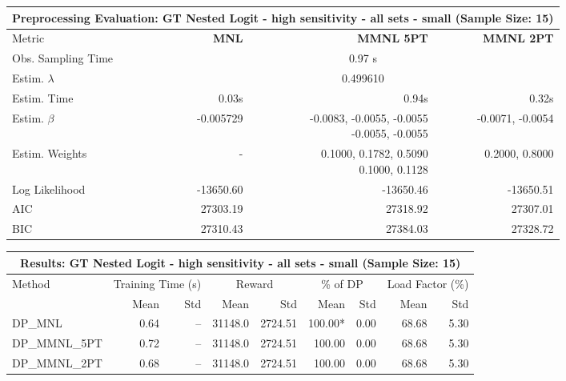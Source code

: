
\begin{samepage}
\begin{center}
  \small
  \begin{tabular}{l|r|r|r}
    \toprule
    \multicolumn{4}{c}{\textbf{Preprocessing Evaluation: GT Nested Logit - high sensitivity - all sets - small (Sample Size: 15)}} \\
    \midrule
    Metric & \textbf{MNL} & \textbf{MMNL 5PT} & \textbf{MMNL 2PT} \\
    \midrule
    Obs. Sampling Time & \multicolumn{3}{c}{0.97 s} \\
    Estim. $\lambda$ & \multicolumn{3}{c}{0.499610} \\
    Estim. Time & 0.03s & 0.94s & 0.32s \\
    Estim. $\beta$ & -0.005729 & \makecell[tr]{-0.0083, -0.0055, -0.0055 \\ -0.0055, -0.0055} & -0.0071, -0.0054 \\
    Estim. Weights & - & \makecell[tr]{0.1000, 0.1782, 0.5090 \\ 0.1000, 0.1128} & 0.2000, 0.8000 \\
    Log Likelihood & -13650.60 & -13650.46 & -13650.51 \\
    AIC & 27303.19 & 27318.92 & 27307.01 \\
    BIC & 27310.43 & 27384.03 & 27328.72 \\
    \bottomrule
  \end{tabular}
\end{center}
\begin{center}
  \small
  \begin{tabular}{l|rr|rr|rr|rr}
    \toprule
    \multicolumn{9}{c}{\textbf{Results: GT Nested Logit - high sensitivity - all sets - small (Sample Size: 15)}} \\
    \midrule
    Method & \multicolumn{2}{c|}{Training Time (s)} & \multicolumn{2}{c|}{Reward} & \multicolumn{2}{c|}{\% of DP} & \multicolumn{2}{c}{Load Factor (\%)} \\
    & Mean & Std & Mean & Std & Mean & Std & Mean & Std \\
    \midrule
    DP\_MNL      &     0.64 &    -- &    31148.0 &    2724.51 & 100.00* &    0.00 &   68.68 &    5.30 \\
    DP\_MMNL\_5PT &     0.72 &    -- &    31148.0 &    2724.51 &  100.00 &    0.00 &   68.68 &    5.30 \\
    DP\_MMNL\_2PT &     0.68 &    -- &    31148.0 &    2724.51 &  100.00 &    0.00 &   68.68 &    5.30 \\

\end{tabular}
\end{center}
\end{samepage}

